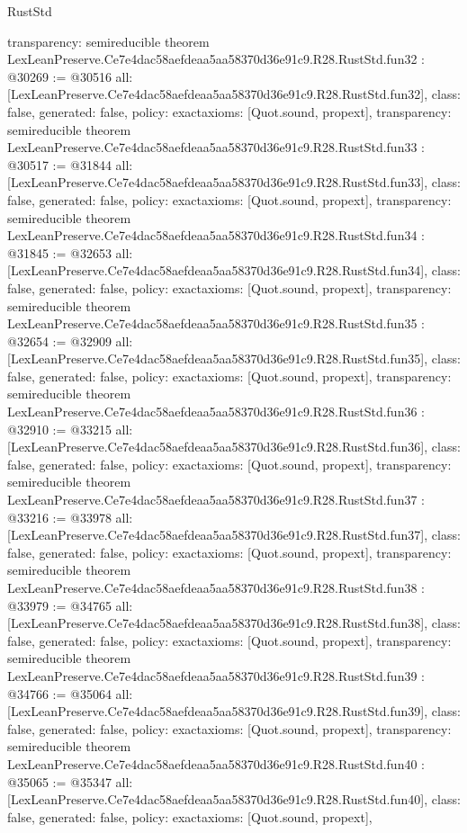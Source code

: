 \begin{lexlean}{RustStd}
\begin{coremodule}
{  transparency: semireducible
}
theorem LexLeanPreserve.Ce7e4dac58aefdeaa5aa58370d36e91c9.R28.RustStd.fun32 : @30269 := @30516 {
  all: [LexLeanPreserve.Ce7e4dac58aefdeaa5aa58370d36e91c9.R28.RustStd.fun32],
  class: false,
  generated: false,
  policy: exact{axioms: [Quot.sound, propext]},
  transparency: semireducible
}
theorem LexLeanPreserve.Ce7e4dac58aefdeaa5aa58370d36e91c9.R28.RustStd.fun33 : @30517 := @31844 {
  all: [LexLeanPreserve.Ce7e4dac58aefdeaa5aa58370d36e91c9.R28.RustStd.fun33],
  class: false,
  generated: false,
  policy: exact{axioms: [Quot.sound, propext]},
  transparency: semireducible
}
theorem LexLeanPreserve.Ce7e4dac58aefdeaa5aa58370d36e91c9.R28.RustStd.fun34 : @31845 := @32653 {
  all: [LexLeanPreserve.Ce7e4dac58aefdeaa5aa58370d36e91c9.R28.RustStd.fun34],
  class: false,
  generated: false,
  policy: exact{axioms: [Quot.sound, propext]},
  transparency: semireducible
}
theorem LexLeanPreserve.Ce7e4dac58aefdeaa5aa58370d36e91c9.R28.RustStd.fun35 : @32654 := @32909 {
  all: [LexLeanPreserve.Ce7e4dac58aefdeaa5aa58370d36e91c9.R28.RustStd.fun35],
  class: false,
  generated: false,
  policy: exact{axioms: [Quot.sound, propext]},
  transparency: semireducible
}
theorem LexLeanPreserve.Ce7e4dac58aefdeaa5aa58370d36e91c9.R28.RustStd.fun36 : @32910 := @33215 {
  all: [LexLeanPreserve.Ce7e4dac58aefdeaa5aa58370d36e91c9.R28.RustStd.fun36],
  class: false,
  generated: false,
  policy: exact{axioms: [Quot.sound, propext]},
  transparency: semireducible
}
theorem LexLeanPreserve.Ce7e4dac58aefdeaa5aa58370d36e91c9.R28.RustStd.fun37 : @33216 := @33978 {
  all: [LexLeanPreserve.Ce7e4dac58aefdeaa5aa58370d36e91c9.R28.RustStd.fun37],
  class: false,
  generated: false,
  policy: exact{axioms: [Quot.sound, propext]},
  transparency: semireducible
}
theorem LexLeanPreserve.Ce7e4dac58aefdeaa5aa58370d36e91c9.R28.RustStd.fun38 : @33979 := @34765 {
  all: [LexLeanPreserve.Ce7e4dac58aefdeaa5aa58370d36e91c9.R28.RustStd.fun38],
  class: false,
  generated: false,
  policy: exact{axioms: [Quot.sound, propext]},
  transparency: semireducible
}
theorem LexLeanPreserve.Ce7e4dac58aefdeaa5aa58370d36e91c9.R28.RustStd.fun39 : @34766 := @35064 {
  all: [LexLeanPreserve.Ce7e4dac58aefdeaa5aa58370d36e91c9.R28.RustStd.fun39],
  class: false,
  generated: false,
  policy: exact{axioms: [Quot.sound, propext]},
  transparency: semireducible
}
theorem LexLeanPreserve.Ce7e4dac58aefdeaa5aa58370d36e91c9.R28.RustStd.fun40 : @35065 := @35347 {
  all: [LexLeanPreserve.Ce7e4dac58aefdeaa5aa58370d36e91c9.R28.RustStd.fun40],
  class: false,
  generated: false,
  policy: exact{axioms: [Quot.sound, propext]},
}
\end{coremodule}
\end{lexlean}
